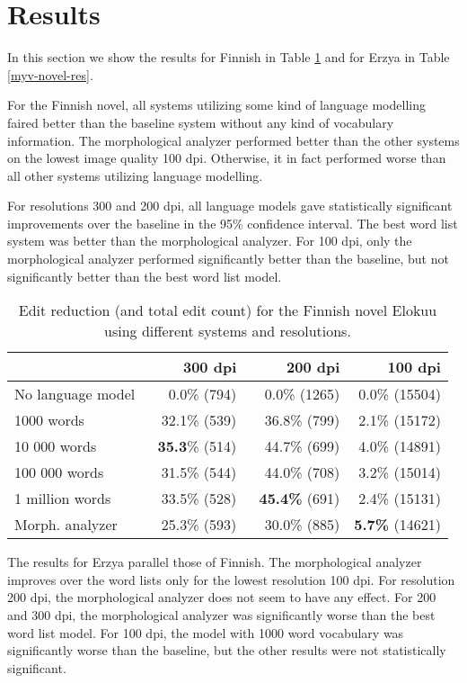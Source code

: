 \documentclass[b5paper]{article}
\begin{document}
\section{Results}
\label{res}
In this section we show the results for Finnish in Table
\ref{fin-novel-res} and for Erzya in Table
\ref{myv-novel-res}. 

For the Finnish novel, all systems utilizing some kind of language
modelling faired better than the baseline system without any kind of
vocabulary information. The morphological analyzer performed better
than the other systems on the lowest image quality 100 dpi. Otherwise,
it in fact performed worse than all other systems utilizing language
modelling.

For resolutions 300 and 200 dpi, all language models gave
statistically significant improvements over the baseline in the 95\%
confidence interval. The best word list system was better than the
morphological analyzer. For 100 dpi, only the morphological analyzer
performed significantly better than the baseline, but not
significantly better than the best word list model.

\begin{table}[!htb]
\begin{center}
\begin{tabular}{lrrr}
\hline 
                  & 300 dpi & 200 dpi & 100 dpi \\
\hline 
No language model & ~0.0\% (794)          & ~0.0\% (1265)          & 0.0\% (15504)  \\
1000 words        & ~32.1\% (539)  & ~36.8\% (799)        & 2.1\% (15172)           \\
10 000 words      & {\bf ~35.3}\% (514)  & ~44.7\%  (699)  & 4.0\% (14891)          \\
100 000 words     & ~31.5\% (544)   & ~44.0\%  (708)  & 3.2\%  (15014)              \\
1 million words   & ~33.5\% (528)   & {\bf ~45.4\%} (691)  & 2.4\% (15131)          \\
Morph. analyzer   & ~25.3\% (593)    & ~30.0\% (885)     & {\bf 5.7\%} (14621)      \\
\hline 
\end{tabular}
\caption{Edit reduction (and total edit count) for the Finnish novel Elokuu using different systems and resolutions.}\label{fin-novel-res}
\end{center}
\end{table}

The results for Erzya parallel those of Finnish. The morphological
analyzer improves over the word lists only for the lowest resolution
100 dpi. For resolution 200 dpi, the morphological analyzer does not
seem to have any effect. For 200 and 300 dpi, the morphological
analyzer was significantly worse than the best word list model. For
100 dpi, the model with 1000 word vocabulary was significantly worse
than the baseline, but the other results were not statistically
significant.
\end{document}
